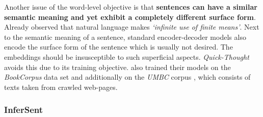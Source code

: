 

Another issue of the word-level objective is that \textbf{sentences can have a similar semantic meaning and yet exhibit a completely different surface form}. Already \citep{Humboldt.1836} observed that natural language makes \textit{`infinite use of finite means'}. Next to the semantic meaning of a sentence, standard encoder-decoder models also encode the surface form of the sentence which is usually not desired. The embeddings should be insusceptible to such superficial aspects. \textit{Quick-Thought} avoids this due to its training objective. \citep{Logeswaran.2018} also trained their models on the \textit{BookCorpus} data set \citep{Zhu.2015} and additionally on the \textit{UMBC} corpus \citep{Han.2013}, which consists of texts taken from crawled web-pages.

\subsubsection{InferSent}
\label{sec:infersent}

